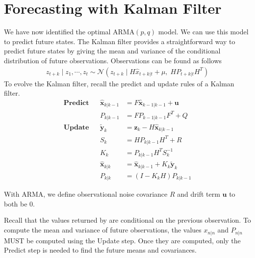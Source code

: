 \section*{Forecasting with Kalman Filter}
We have now identified the optimal ARMA$(p,q)$ model.
We can use this model to predict future states.
The Kalman filter provides a straightforward way to predict future states by giving the mean and variance of the conditional distribution of future observations.
Observations can be found as follows
\begin{align}
    z_{t + k} \mid z_{1}, \cdots, z_{t} \sim \mathscr{N}(z_{t+k} \mid H\hat{x}_{t+k|t} + \mu,\;
    HP_{t+k|t}H^T)
\end{align}
To evolve the Kalman filter, recall the predict and update rules of a Kalman filter.
\begin{align*}
\textbf{Predict} & & \widehat{\mathbf{x}}_{k|k-1} & = F\widehat{\mathbf{x}}_{k-1|k-1} + \mathbf{u} \\
 & & P_{k|k-1} & = FP_{k-1|k-1}F^{T} + Q \\
\textbf{Update} & & \tilde{\mathbf{y}}_{k} & = \mathbf{z}_{k} - H\widehat{\mathbf{x}}_{k|k-1} \\
 & & S_{k} & = HP_{k|k-1}H^{T} + R \\
 & & K_{k} & = P_{k|k-1}H^{T}S_{k}^{-1} \\
 & & \widehat{\mathbf{x}}_{k|k} & = \widehat{\mathbf{x}}_{k|k-1} + K_{k}\tilde{\mathbf{y}}_{k} \\
 & & P_{k|k} & = (I - K_{k}H)P_{k|k-1}
\end{align*}

\noindent With ARMA, we define observational noise covariance $R$ and drift term $\mathbf{u}$ to both be 0.

\begin{warn}
Recall that the values returned by  are conditional on the previous observation.
To compute the mean and variance of future observations, the values $x_{n|n}$ and $P_{n|n}$ MUST be computed using the Update step.
Once they are computed, only the Predict step is needed to find the future means and covariances.
\end{warn}

